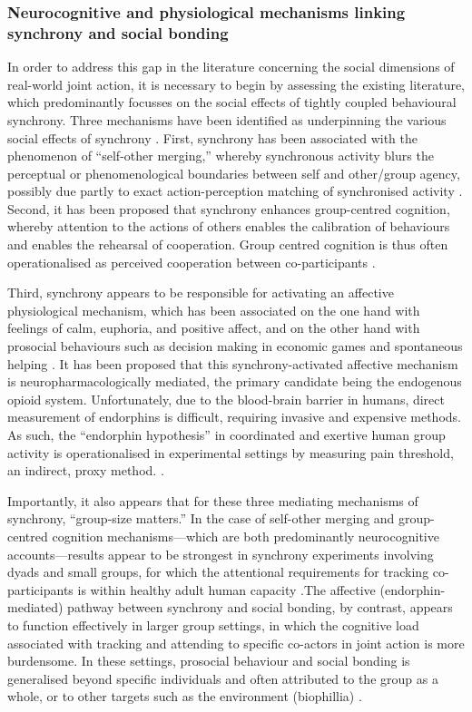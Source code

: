 \subsubsection{Neurocognitive and physiological mechanisms linking synchrony and social bonding}
In order to address this gap in the literature concerning the social dimensions of real-world joint action, it is necessary to begin by assessing the existing literature, which predominantly focusses on the social effects of tightly coupled behavioural synchrony. Three mechanisms have been identified as underpinning the various social effects of synchrony \citep{Lang2017,Mogan2017}.  First, synchrony has been associated with the phenomenon of ``self-other merging,'' whereby synchronous activity blurs the perceptual or phenomenological boundaries between self and other/group agency, possibly due partly to exact action-perception matching of synchronised activity \citep{Hove2008}.  Second, it has been proposed that synchrony enhances group-centred cognition, whereby attention to the actions of others enables the calibration of behaviours and enables the rehearsal of cooperation. Group centred cognition is thus often operationalised as perceived cooperation between co-participants \citep{Reddish2013}.

Third, synchrony appears to be responsible for activating an affective physiological mechanism, which has been associated on the one hand with feelings of calm, euphoria, and positive affect, and on the other hand with prosocial behaviours such as decision making in economic games and spontaneous helping \citep{Wiltermuth2009,Reddish2013a,Mogan2017}.
It has been proposed that this synchrony-activated affective mechanism is neuropharmacologically mediated, the primary candidate being the endogenous opioid system.  Unfortunately, due to the blood-brain barrier in humans, direct measurement of endorphins is difficult, requiring invasive and expensive methods.  As such, the ``endorphin hypothesis'' in coordinated and exertive human group activity is operationalised in experimental settings by measuring pain threshold, an indirect, proxy method. \citep{Dunbar2008,Sullivan2013,Sullivan2014,Tarr2015}.

Importantly, it also appears that for these three mediating mechanisms of synchrony, ``group-size matters.'' In the case of self-other merging and group-centred cognition mechanisms---which are both predominantly neurocognitive accounts---results appear to be strongest in synchrony experiments involving dyads and small groups, for which the attentional requirements for tracking co-participants is within healthy adult human capacity \citep{Mogan2017}.The affective (endorphin-mediated) pathway between synchrony and social bonding, by contrast, appears to function effectively in larger group settings, in which the cognitive load associated with tracking and attending to specific co-actors in joint action is more burdensome.  In these settings, prosocial behaviour and social bonding is generalised beyond specific individuals and often attributed to the group as a whole, or to other targets such as the environment (biophillia) \citep{Reddish2013b, Reddish2016}.

